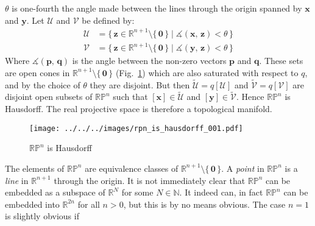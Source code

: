 \documentclass{article}
\theoremstyle{plain}
\theoremstyle{normal}
\newenvironment{example}{%
    \pushQED{\qed}\renewcommand{\qedsymbol}{$\blacksquare$}\examplex%
}{%
    \popQED\endexamplex%
}
\begin{document}
\begin{example}[\textbf{Real Projective Space}]
            $\theta$ is one-fourth the angle made between the lines through
            the origin spanned by $\mathbf{x}$ and $\mathbf{y}$. Let
            $\mathcal{U}$ and $\mathcal{V}$ be defined by:
            \begin{align}
                \mathcal{U}
                &=\big\{\,
                    \mathbf{z}\in\mathbb{R}^{n+1}\setminus\{\,\mathbf{0}\,\}
                        \;|\;\measuredangle(\mathbf{x},\,\mathbf{z})<\theta\,
                    \big\}\\
                \mathcal{V}
                &=\big\{\,
                    \mathbf{z}\in\mathbb{R}^{n+1}\setminus\{\,\mathbf{0}\,\}
                        \;|\;\measuredangle(\mathbf{y},\,\mathbf{z})<\theta\,
                    \big\}
            \end{align}
            Where $\measuredangle(\mathbf{p},\,\mathbf{q})$ is the angle
            between the non-zero vectors $\mathbf{p}$ and $\mathbf{q}$. These
            sets are open cones in
            $\mathbb{R}^{n+1}\setminus\{\,\mathbf{0}\,\}$
            (Fig.~\ref{fig:rpn_is_hausdorff_001}) which are also
            saturated with respect to $q$, and by the choice of $\theta$ they
            are disjoint. But then $\tilde{\mathcal{U}}=q[\mathcal{U}]$ and
            $\tilde{\mathcal{V}}=q[\mathcal{V}]$ are disjoint open subsets of
            $\mathbb{RP}^{n}$ such that
            $[\mathbf{x}]\in\tilde{\mathcal{U}}$ and
            $[\mathbf{y}]\in\tilde{\mathcal{V}}$. Hence $\mathbb{RP}^{n}$ is
            Hausdorff. The real projective space is therefore a topological
            manifold.
        \end{example}
        \begin{figure}
            \centering
            \texttt{[image: ../../../images/rpn\_is\_hausdorff\_001.pdf]}
            \caption{$\mathbb{RP}^{n}$ is Hausdorff}
            \label{fig:rpn_is_hausdorff_001}
        \end{figure}
        The elements of $\mathbb{RP}^{n}$ are equivalence classes of
        $\mathbb{R}^{n+1}\setminus\{\,\mathbf{0}\,\}$. A
        \textit{point} in $\mathbb{RP}^{n}$ is a \textit{line} in
        $\mathbb{R}^{n+1}$ through the origin. It is not immediately clear that
        $\mathbb{RP}^{n}$ can be embedded as a subspace of $\mathbb{R}^{N}$ for
        some $N\in\mathbb{N}$. It indeed can, in fact
        $\mathbb{RP}^{n}$ can be embedded into $\mathbb{R}^{2n}$ for all $n>0$,
        but this is by no means obvious. The case $n=1$ is slightly obvious if
\end{document}
